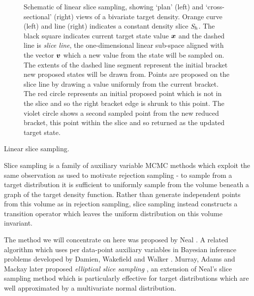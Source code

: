 \begin{figure}[t]
\centering
\begin{subfigure}[b]{.46\linewidth}
\centering
{}
\vspace{3mm}
\end{subfigure}
\begin{subfigure}[b]{.46\linewidth}
\centering
{}
\end{subfigure}
\caption[Visualisation of linear slice sampling.]{Schematic of linear slice sampling, showing `plan' (left) and `cross-sectional' (right) views of a bivariate target density. Orange curve (left) and line (right) indicates a constant density slice $\mathit{S}_h$. The black square indicates current target state value $\boldsymbol{x}$ and the dashed line is \emph{slice line}, the one-dimensional linear sub-space aligned with the vector $\boldsymbol{v}$ which a new value from the state will be sampled on. The extents of the dashed line segment represent the initial bracket new proposed states will be drawn from. Points are proposed on the slice line by drawing a value uniformly from the current bracket. The red circle represents an initial proposed point which is not in the slice and so the right bracket edge is shrunk to this point. The violet circle shows a second sampled point from the new reduced bracket, this point within the slice and so returned as the updated target state.}
\label{fig:slice-sampling}
\end{figure}

\begin{algorithm}[t]
\caption{Linear slice sampling.}
\label{alg:linear-slice-sampling}

\end{algorithm}

Slice sampling is a family of auxiliary variable \ac{MCMC} methods which exploit the same observation as used to motivate rejection sampling - to sample from a target distribution it is sufficient to uniformly sample from the volume beneath a graph of the target density function. Rather than generate independent points from this volume as in rejection samp\-ling, slice sampling instead constructs a transition operator which leaves the uniform distribution on this volume invariant.

The method we will concentrate on here was proposed by Neal \citep{neal1997markov,neal2003slice}. A related algorithm which uses per data-point auxiliary variables in Bayesian inference problems developed by Damien, Wakefield and Walker \citep{damien1999gibbs}. Murray, Adams and Mackay later proposed \emph{elliptical slice sampling} \citep{murray2010elliptical}, an extension of Neal's slice sampling method which is particularly effective for target distributions which are well approximated by a multivariate normal distribution. %

